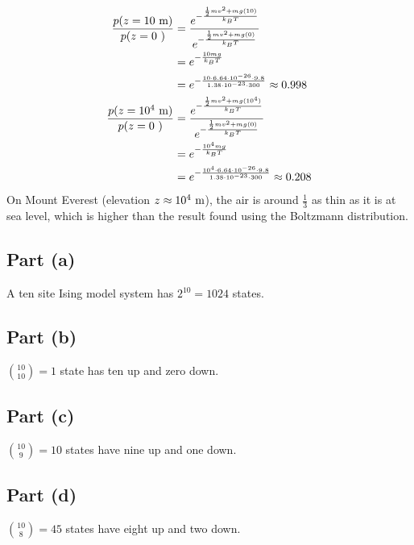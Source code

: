 \documentclass{article}
\begin{document}
\begin{equation}
    \begin{split}
        \frac{p(z = 10~\unit[per-mode = symbol]{\meter})}{p(z = 0~\unit[per-mode = symbol])} & = \frac{e^{-\frac{\frac{1}{2}mv^2 + mg(10)}{k_B T}}}{e^{-\frac{\frac{1}{2}mv^2 + mg(0)}{k_B T}}} \\
        & = e^{-\frac{10mg}{k_B T}} \\
        & = e^{-\frac{10 \cdot 6.64 \cdot 10^{-26} \cdot 9.8}{1.38 \cdot 10^{-23} \cdot 300}} \approx 0.998 \\
        \frac{p(z = 10^4~\unit[per-mode = symbol]{\meter})}{p(z = 0~\unit[per-mode = symbol])} & = \frac{e^{-\frac{\frac{1}{2}mv^2 + mg(10^4)}{k_B T}}}{e^{-\frac{\frac{1}{2}mv^2 + mg(0)}{k_B T}}} \\
        & = e^{-\frac{10^4mg}{k_B T}} \\
        & = e^{-\frac{10^4 \cdot 6.64 \cdot 10^{-26} \cdot 9.8}{1.38 \cdot 10^{-23} \cdot 300}} \approx 0.208 \\
    \end{split}
\end{equation}
On Mount Everest (elevation $z \approx 10^4~\unit[per-mode = symbol]{\meter}$), the air is around $\frac{1}{3}$ as thin as it is at sea level, which is higher than the result found using the Boltzmann distribution.

\clearpage

\problem
\subsection*{Part (a)}
A ten site Ising model system has $2^{10} = 1024$ states.
\subsection*{Part (b)}
${10 \choose 10} = 1$ state has ten up and zero down.
\subsection*{Part (c)}
${10 \choose 9} = 10$ states have nine up and one down.
\subsection*{Part (d)}
${10 \choose 8} = 45$ states have eight up and two down.
\end{document}
